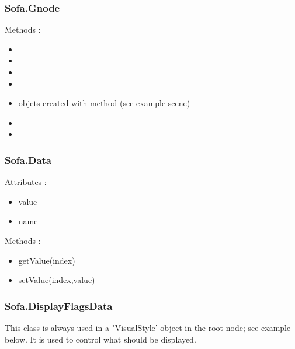 \subsubsection{Sofa.Gnode}
Methods :
\begin{itemize}
\item {} 
\item {} 
\item {} 
\item {} 
\item {} objets created with  method  (see example scene)
\item {} 
\item {} 
\end{itemize}


\subsubsection{Sofa.Data}
Attributes :
\begin{itemize}
\item value
\item name
\end{itemize}
Methods :
\begin{itemize}
\item getValue(index)
\item setValue(index,value)
\end{itemize}

\subsubsection{Sofa.DisplayFlagsData}

This class is always used in a "VisualStyle' object in the root node; see example below. It is used to control what should be displayed.

